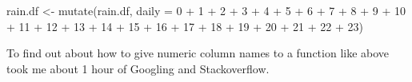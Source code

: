 \documentclass[
]{article}
\newenvironment{Shaded}{\begin{snugshade}}{\end{snugshade}}
\newcommand{\AttributeTok}[1]{\textcolor[rgb]{0.77,0.63,0.00}{#1}}
\newcommand{\FunctionTok}[1]{\textcolor[rgb]{0.00,0.00,0.00}{#1}}
\newcommand{\NormalTok}[1]{#1}
\newcommand{\OtherTok}[1]{\textcolor[rgb]{0.56,0.35,0.01}{#1}}
\newcommand{\SpecialCharTok}[1]{\textcolor[rgb]{0.00,0.00,0.00}{#1}}
\newcommand{\StringTok}[1]{\textcolor[rgb]{0.31,0.60,0.02}{#1}}
\begin{document}
\begin{Shaded}
\begin{Highlighting}[]
\NormalTok{rain.df }\OtherTok{\textless{}{-}} \FunctionTok{mutate}\NormalTok{(rain.df, }\AttributeTok{daily =} \StringTok{\textasciigrave{}}\AttributeTok{0}\StringTok{\textasciigrave{}} \SpecialCharTok{+} \StringTok{\textasciigrave{}}\AttributeTok{1}\StringTok{\textasciigrave{}} \SpecialCharTok{+} \StringTok{\textasciigrave{}}\AttributeTok{2}\StringTok{\textasciigrave{}} \SpecialCharTok{+} \StringTok{\textasciigrave{}}\AttributeTok{3}\StringTok{\textasciigrave{}} \SpecialCharTok{+} \StringTok{\textasciigrave{}}\AttributeTok{4}\StringTok{\textasciigrave{}} \SpecialCharTok{+}
    \StringTok{\textasciigrave{}}\AttributeTok{5}\StringTok{\textasciigrave{}} \SpecialCharTok{+} \StringTok{\textasciigrave{}}\AttributeTok{6}\StringTok{\textasciigrave{}} \SpecialCharTok{+} \StringTok{\textasciigrave{}}\AttributeTok{7}\StringTok{\textasciigrave{}} \SpecialCharTok{+} \StringTok{\textasciigrave{}}\AttributeTok{8}\StringTok{\textasciigrave{}} \SpecialCharTok{+} \StringTok{\textasciigrave{}}\AttributeTok{9}\StringTok{\textasciigrave{}} \SpecialCharTok{+} \StringTok{\textasciigrave{}}\AttributeTok{10}\StringTok{\textasciigrave{}} \SpecialCharTok{+} \StringTok{\textasciigrave{}}\AttributeTok{11}\StringTok{\textasciigrave{}} \SpecialCharTok{+} \StringTok{\textasciigrave{}}\AttributeTok{12}\StringTok{\textasciigrave{}} \SpecialCharTok{+} \StringTok{\textasciigrave{}}\AttributeTok{13}\StringTok{\textasciigrave{}} \SpecialCharTok{+}
    \StringTok{\textasciigrave{}}\AttributeTok{14}\StringTok{\textasciigrave{}} \SpecialCharTok{+} \StringTok{\textasciigrave{}}\AttributeTok{15}\StringTok{\textasciigrave{}} \SpecialCharTok{+} \StringTok{\textasciigrave{}}\AttributeTok{16}\StringTok{\textasciigrave{}} \SpecialCharTok{+} \StringTok{\textasciigrave{}}\AttributeTok{17}\StringTok{\textasciigrave{}} \SpecialCharTok{+} \StringTok{\textasciigrave{}}\AttributeTok{18}\StringTok{\textasciigrave{}} \SpecialCharTok{+} \StringTok{\textasciigrave{}}\AttributeTok{19}\StringTok{\textasciigrave{}} \SpecialCharTok{+} \StringTok{\textasciigrave{}}\AttributeTok{20}\StringTok{\textasciigrave{}} \SpecialCharTok{+} \StringTok{\textasciigrave{}}\AttributeTok{21}\StringTok{\textasciigrave{}} \SpecialCharTok{+} \StringTok{\textasciigrave{}}\AttributeTok{22}\StringTok{\textasciigrave{}} \SpecialCharTok{+}
    \StringTok{\textasciigrave{}}\AttributeTok{23}\StringTok{\textasciigrave{}}\NormalTok{)}
\end{Highlighting}
\end{Shaded}

To find out about how to give numeric column names to a function like
above took me about 1 hour of Googling and Stackoverflow.
\end{document}
